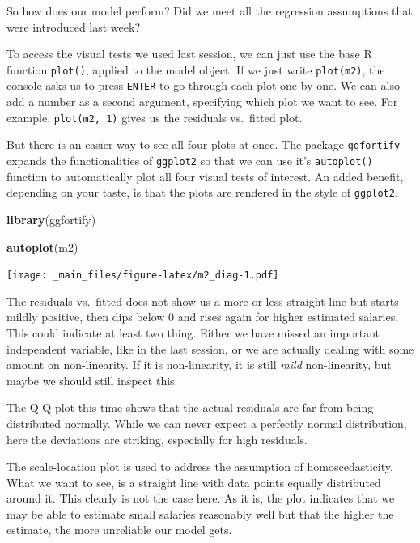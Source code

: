 \documentclass[
]{book}
\newenvironment{Shaded}{\begin{snugshade}}{\end{snugshade}}
\newcommand{\FunctionTok}[1]{\textcolor[rgb]{0.13,0.29,0.53}{\textbf{#1}}}
\newcommand{\NormalTok}[1]{#1}
\begin{document}
So how does our model perform? Did we meet all the regression assumptions that
were introduced last week?

To access the visual tests we used last session, we can just use the base R
function \texttt{plot()}, applied to the model object. If we just write \texttt{plot(m2)}, the
console asks us to press \texttt{ENTER} to go through each plot one by one. We can also
add a number as a second argument, specifying which plot we want to see. For
example, \texttt{plot(m2,\ 1)} gives us the residuals vs.~fitted plot.

But there is an easier way to see all four plots at once. The package
\texttt{ggfortify} expands the functionalities of \texttt{ggplot2} so that we can use it's
\texttt{autoplot()} function to automatically plot all four visual tests of interest.
An added benefit, depending on your taste, is that the plots are rendered in the
style of \texttt{ggplot2}.

\begin{Shaded}
\begin{Highlighting}[]
\FunctionTok{library}\NormalTok{(ggfortify)}

\FunctionTok{autoplot}\NormalTok{(m2)}
\end{Highlighting}
\end{Shaded}

\texttt{[image: \_main\_files/figure-latex/m2\_diag-1.pdf]}

The residuals vs.~fitted does not show us a more or less straight line but
starts mildly positive, then dips below \(0\) and rises again for higher estimated
salaries. This could indicate at least two thing. Either we have missed an
important independent variable, like in the last session, or we are actually
dealing with some amount on non-linearity. If it is non-linearity, it is still
\emph{mild} non-linearity, but maybe we should still inspect this.

The Q-Q plot this time shows that the actual residuals are far from being
distributed normally. While we can never expect a perfectly normal distribution,
here the deviations are striking, especially for high residuals.

The scale-location plot is used to address the assumption of homoscedasticity.
What we want to see, is a straight line with data points equally distributed
around it. This clearly is not the case here. As it is, the plot indicates
that we may be able to estimate small salaries reasonably well but that the
higher the estimate, the more unreliable our model gets.
\end{document}
